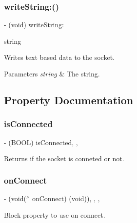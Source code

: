 \subsubsection{\texorpdfstring{write\+String\+:()}{writeString:()}}
{\footnotesize\ttfamily -\/ (void) write\+String\+: \begin{DoxyParamCaption}\item[{(nonnull N\+S\+String $\ast$)}]{string }\end{DoxyParamCaption}}

Writes text based data to the socket. 
\begin{DoxyParams}{Parameters}
{\em string} & The string. \\
\hline
\end{DoxyParams}


\subsection{Property Documentation}
\hypertarget{interface_s_t_c_web_socket_a141075afd2a09ce60a8271f5d59860d8}{}\label{interface_s_t_c_web_socket_a141075afd2a09ce60a8271f5d59860d8} 
\subsubsection{\texorpdfstring{is\+Connected}{isConnected}}
{\footnotesize\ttfamily -\/ (B\+O\+OL) is\+Connected\hspace{0.3cm}{\ttfamily [read]}, {\ttfamily [nonatomic]}, {\ttfamily [assign]}}

Returns if the socket is conneted or not. \hypertarget{interface_s_t_c_web_socket_aec098d58709743122bd14d1b815f20cf}{}\label{interface_s_t_c_web_socket_aec098d58709743122bd14d1b815f20cf} 
\subsubsection{\texorpdfstring{on\+Connect}{onConnect}}
{\footnotesize\ttfamily -\/ (void($^\wedge$ on\+Connect) (void))\hspace{0.3cm}{\ttfamily [read]}, {\ttfamily [write]}, {\ttfamily [nonatomic]}, {\ttfamily [strong]}}

Block property to use on connect. \hypertarget{interface_s_t_c_web_socket_af753eb23ff33a248c017d6a78c7756f6}{}\label{interface_s_t_c_web_socket_af753eb23ff33a248c017d6a78c7756f6} 
